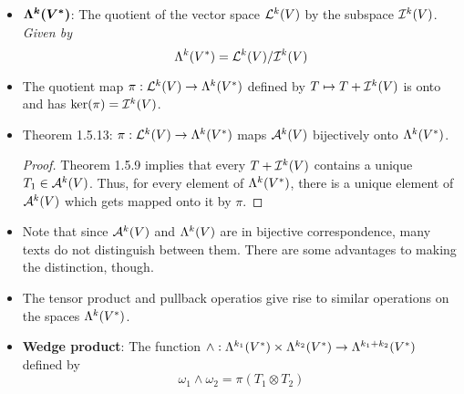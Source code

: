\documentclass[../notes.tex]{subfiles}
\begin{document}
\begin{itemize}
    \begin{proof}
        By Corollary 1.5.6, we have that
        \begin{align*}
            \Alt(T) &= k!T+W\\
            T &= \underbrace{\left( \frac{1}{k!}\Alt(T) \right)}_{T_1}+\underbrace{\left( -\frac{1}{k!}W \right)}_{T_2}
        \end{align*}
        As to uniqueness, suppose $0=T_1+T_2$ where $T_1\in\alt[k]{V}$ and $T_2\in\ide[k]{V}$. Then
        \begin{align*}
            0 &= \Alt(0)
                = \Alt(T_1+T_2)
                = \Alt(T_1)+\Alt(T_2)
                = k!T_1+0
                = k!T_1\\
            T_1 &= 0
        \end{align*}
        so $T_2=0$, too.
    \end{proof}
    \item $\bm{\lam[k]{V^*}}$: The quotient of the vector space $\lin[k]{V}$ by the subspace $\ide[k]{V}$. \emph{Given by}
    \begin{equation*}
        \lam[k]{V^*} = \lin[k]{V}/\ide[k]{V}
    \end{equation*}
    \item The quotient map $\pi:\lin[k]{V}\to\lam[k]{V^*}$ defined by $T\mapsto T+\ide[k]{V}$ is onto and has $\ker(\pi)=\ide[k]{V}$.
    \item Theorem 1.5.13: $\pi:\lin[k]{V}\to\lam[k]{V^*}$ maps $\alt[k]{V}$ bijectively onto $\lam[k]{V^*}$.
    \begin{proof}
        Theorem 1.5.9 implies that every $T+\ide[k]{V}$ contains a unique $T_1\in\alt[k]{V}$. Thus, for every element of $\lam[k]{V^*}$, there is a unique element of $\alt[k]{V}$ which gets mapped onto it by $\pi$.
    \end{proof}
    \item Note that since $\alt[k]{V}$ and $\lam[k]{V}$ are in bijective correspondence, many texts do not distinguish between them. There are some advantages to making the distinction, though.
    \item The tensor product and pullback operatios give rise to similar operations on the spaces $\lam[k]{V^*}$.
    \item \textbf{Wedge product}: The function $\wedge:\lam[k_1]{V^*}\times\lam[k_2]{V^*}\to\lam[k_1+k_2]{V^*}$ defined by
    \begin{equation*}
        \omega_1\wedge\omega_2 = \pi(T_1\otimes T_2)
    \end{equation*}

\end{itemize}
\end{document}
